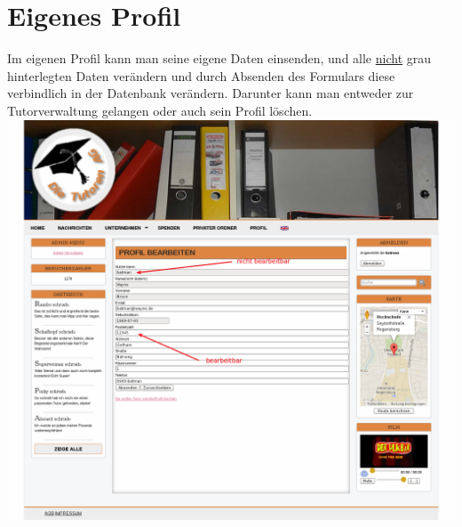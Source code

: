 
\section{Eigenes Profil}
Im eigenen Profil kann man seine eigene Daten einsenden, und alle \underline{nicht} grau hinterlegten Daten verändern und durch Absenden des Formulars diese verbindlich in der Datenbank verändern.
Darunter kann man entweder zur Tutorverwaltung gelangen oder auch sein Profil löschen.\\
\includegraphics[width=1\textwidth]{../Screenshots/de/Profil-bearbeiten}